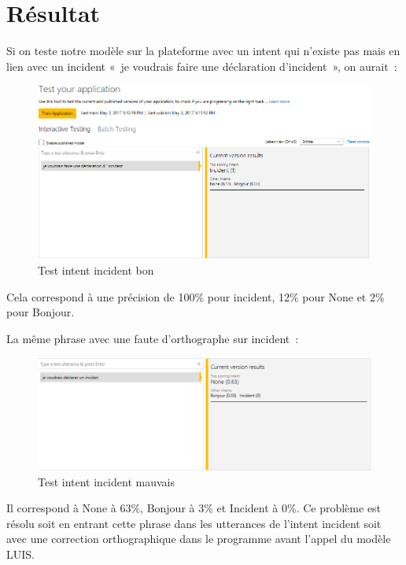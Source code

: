 \section{Résultat}


Si on teste notre modèle sur la plateforme avec un intent qui n’existe pas mais en lien avec un incident « je voudrais faire une déclaration d’incident », on aurait :

\begin{figure}[H]
	\centering
		\includegraphics[width = \textwidth]{test1.png}
	\caption{Test intent incident bon}
	\label{fig:Test intent incident bon}
\end{figure}


Cela correspond à une précision de 100\% pour incident, 12\% pour None et 2\% pour Bonjour.
\vspace{1em}

La même phrase avec une faute d’orthographe sur incident :
\vspace{1em}

\begin{figure}[H]
	\centering
		\includegraphics[width = \textwidth]{test2.png}
	\caption{Test intent incident mauvais}
	\label{fig:Test intent incident mauvais}
\end{figure}

Il correspond à None à 63\%, Bonjour à 3\% et Incident à 0\%. Ce problème est résolu soit en entrant cette phrase dans les utterances de l’intent incident soit avec une correction orthographique dans le programme avant l’appel du modèle LUIS.
\vspace{1em}

